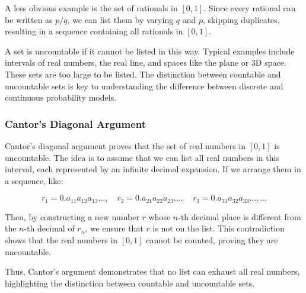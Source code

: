 A less obvious example is the set of rationals in \([0,1]\). Since every rational can be written as \(p/q\), we can list them by varying \(q\) and \(p\), skipping duplicates, resulting in a sequence containing all rationals in \([0,1]\).

A set is uncountable if it cannot be listed in this way. Typical examples include intervals of real numbers, the real line, and spaces like the plane or 3D space. These sets are too large to be listed. The distinction between countable and uncountable sets is key to understanding the difference between discrete and continuous probability models.


\subsubsection{Cantor’s Diagonal Argument}

Cantor's diagonal argument proves that the set of real numbers in \([0,1]\) is uncountable. The idea is to assume that we can list all real numbers in this interval, each represented by an infinite decimal expansion. If we arrange them in a sequence, like:

\[
r_1 = 0.a_{11}a_{12}a_{13}\dots, \quad r_2 = 0.a_{21}a_{22}a_{23}\dots, \quad r_3 = 0.a_{31}a_{32}a_{33}\dots, \dots
\]

Then, by constructing a new number \(r\) whose \(n\)-th decimal place is different from the \(n\)-th decimal of \(r_n\), we ensure that \(r\) is not on the list. This contradiction shows that the real numbers in \([0,1]\) cannot be counted, proving they are uncountable.

Thus, Cantor's argument demonstrates that no list can exhaust all real numbers, highlighting the distinction between countable and uncountable sets.


